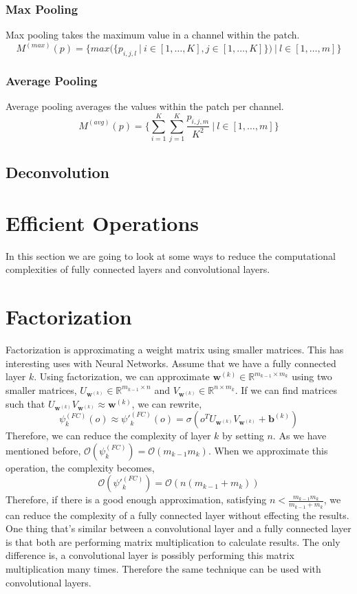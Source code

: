 \subsubsection{Max Pooling}
Max pooling takes the maximum value in a channel within the patch.
$$ M^{(max)}(p) = \bigg\{max\big(\{p_{i,j,l} \ |\  i \in [1, \ldots, K],  j \in [1, \ldots, K] \}\big) \ |\  l \in [1, \ldots, m] \bigg\} $$
\subsubsection{Average Pooling}
Average pooling averages the values within the patch per channel. 
$$ M^{(avg)}(p) = \{\sum_{i=1}^{K}\sum_{j=1}^{K}\frac{p_{i,j,m}}{K^2} \ | \  l \in [1, \ldots, m] \} $$

\subsection{Deconvolution}


\section{Efficient Operations}
In this section we are going to look at some ways to reduce the computational complexities of fully connected layers and convolutional layers. 

\section{Factorization}
Factorization is approximating a weight matrix using smaller matrices. This has interesting uses with Neural Networks. Assume that we have a fully connected layer $k$. Using factorization, we can approximate $\mathbf{w}^{(k)} \in \mathbb{R}^{m_{k-1} \times m_k}$ using two smaller matrices, $U_{\mathbf{w}^{(k)}} \in \mathbb{R}^{m_{k-1} \times n}$ and $V_{\mathbf{w}^{(k)}} \in \mathbb{R}^{n \times m_{k}}$. If we can find matrices such that $U_{\mathbf{w}^{(k)}}V_{\mathbf{w}^{(k)}} \approx \mathbf{w}^{(k)}$, we can rewrite, 
$$\psi^{(FC)}_k(o) \approx \psi'^{(FC)}_k(o) = \sigma(o^T U_{\mathbf{w}^{(k)}}V_{\mathbf{w}^{(k)}} +\mathbf{b}^{(k)})$$
Therefore, we can reduce the complexity of layer $k$ by setting $n$. As we have mentioned before, $\mathcal{O}(\psi_k^{(FC)}) = \mathcal{O}(m_{k-1}m_k)$. When we approximate this operation, the complexity becomes, 
$$\mathcal{O}(\psi'^{(FC)}_k) = \mathcal{O}(n(m_{k-1}+m_k))$$
Therefore, if there is a good enough approximation, satisfying $n < \frac{m_{k-1}m_k}{m_{k-1}+m_k}$, we can reduce the complexity of a fully connected layer without effecting the results.
One thing that's similar between a convolutional layer and a fully connected layer is that both are performing matrix multiplication to calculate results. The only difference is, a convolutional layer is possibly performing this matrix multiplication many times. Therefore the same technique can be used with convolutional layers. 


